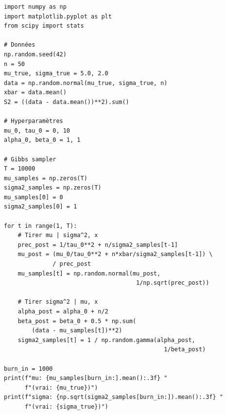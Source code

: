 \begin{codeblock}[title=\textbf{Gibbs pour le mod\`ele normal}]
\begin{verbatim}
import numpy as np
import matplotlib.pyplot as plt
from scipy import stats

# Données
np.random.seed(42)
n = 50
mu_true, sigma_true = 5.0, 2.0
data = np.random.normal(mu_true, sigma_true, n)
xbar = data.mean()
S2 = ((data - data.mean())**2).sum()

# Hyperparamètres
mu_0, tau_0 = 0, 10
alpha_0, beta_0 = 1, 1

# Gibbs sampler
T = 10000
mu_samples = np.zeros(T)
sigma2_samples = np.zeros(T)
mu_samples[0] = 0
sigma2_samples[0] = 1

for t in range(1, T):
    # Tirer mu | sigma^2, x
    prec_post = 1/tau_0**2 + n/sigma2_samples[t-1]
    mu_post = (mu_0/tau_0**2 + n*xbar/sigma2_samples[t-1]) \
              / prec_post
    mu_samples[t] = np.random.normal(mu_post,
                                      1/np.sqrt(prec_post))

    # Tirer sigma^2 | mu, x
    alpha_post = alpha_0 + n/2
    beta_post = beta_0 + 0.5 * np.sum(
        (data - mu_samples[t])**2)
    sigma2_samples[t] = 1 / np.random.gamma(alpha_post,
                                              1/beta_post)

burn_in = 1000
print(f"mu: {mu_samples[burn_in:].mean():.3f} "
      f"(vrai: {mu_true})")
print(f"sigma: {np.sqrt(sigma2_samples[burn_in:]).mean():.3f} "
      f"(vrai: {sigma_true})")
\end{verbatim}
\end{codeblock}

